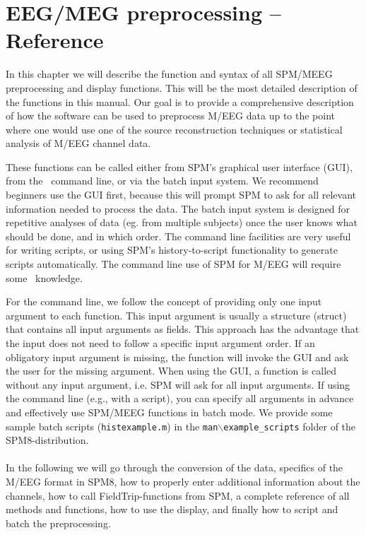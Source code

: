 \chapter{EEG/MEG preprocessing -- Reference \label{Chap:eeg:preprocessing}}

In this chapter we will describe the function and syntax of all SPM/MEEG preprocessing and display functions. This will be the most detailed description of the functions in this manual. Our goal is to provide a comprehensive description of how the software can be used to preprocess M/EEG data up to the point where one would use one of the source reconstruction techniques or statistical analysis of M/EEG channel data.

These functions can be called either from SPM's graphical user interface (GUI), from the \matlab\ command line, or via the batch input system. We recommend beginners use the GUI first, because this will prompt SPM to ask for all relevant information needed to process the data. The batch input system is designed for repetitive analyses of data (eg. from multiple subjects) once the user knows what should be done, and in which order. The command line facilities are very useful for writing scripts, or using SPM's history-to-script functionality to generate scripts automatically. The command line use of SPM for M/EEG will require some \matlab\ knowledge.

For the command line, we follow the concept of providing only one input argument to each function. This input argument is usually a structure (struct) that contains all input arguments as fields. This approach has the advantage that the input does not need to follow a specific input argument order. If an obligatory input argument is missing, the function will invoke the GUI and ask the user for the missing argument. When using the GUI, a function is called without any input argument, i.e. SPM will ask for all input arguments. If using the command line (e.g., with a script), you can specify all arguments in advance and effectively use SPM/MEEG functions in batch mode. We provide some sample batch scripts (\texttt{histexample.m}) in the \texttt{man$\backslash$example\_scripts} folder of the SPM8-distribution.
\\
\\
In the following we will go through the conversion of the data, specifics of the M/EEG format in SPM8, how to properly enter additional information about the channels, how to call FieldTrip-functions from SPM, a complete reference of all methods and functions, how to use the display, and finally how to script and batch the preprocessing.

